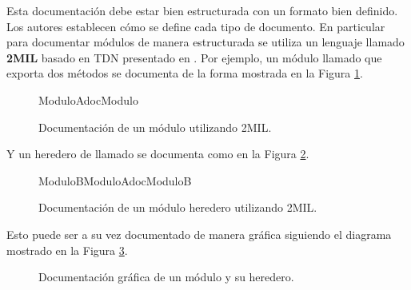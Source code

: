 
Esta documentación debe estar bien estructurada con un formato bien definido. Los autores establecen cómo se define cada tipo de documento. En particular para documentar módulos de manera estructurada se utiliza un lenguaje llamado \textbf{2MIL} basado en TDN presentado en \cite{2mil}. Por ejemplo, un módulo llamado \ModuloA que exporta dos métodos se documenta de la forma mostrada en la Figura \ref{docModulo}.

\begin{figure}[H]
\caption{Documentación de un módulo utilizando 2MIL.}
\label{docModulo}
\begin{module}[]{ModuloA}{}{docModulo}
  \exports
\end{module}
\end{figure}

Y un heredero de \ModuloA llamado \ModuloB se documenta como en la Figura \ref{docModuloHere}.

\begin{figure}[H]
\caption{Documentación de un módulo heredero utilizando 2MIL.}
\label{docModuloHere}
\begin{hmodule}[]{ModuloB}{ModuloA}{}{docModuloB}
  \exports
\end{hmodule}
\end{figure}

Esto puede ser a su vez documentado de manera gráfica siguiendo el diagrama mostrado en la Figura \ref{moduloGraf}.

\begin{figure}[H]
\begin{center}
\caption{Documentación gráfica de un módulo y su heredero.}
\label{moduloGraf}
\end{center}
\end{figure}


